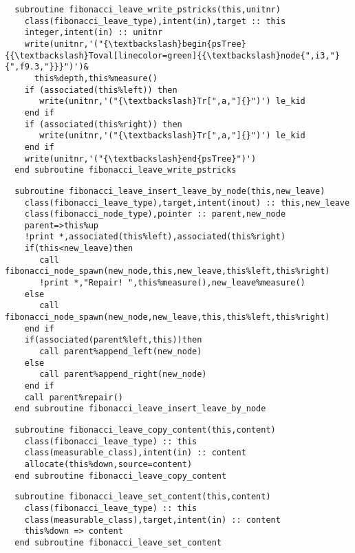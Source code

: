 \begin{Verbatim}
  subroutine fibonacci_leave_write_pstricks(this,unitnr)
    class(fibonacci_leave_type),intent(in),target :: this
    integer,intent(in) :: unitnr
    write(unitnr,'("{\textbackslash}begin{psTree}{{\textbackslash}Toval[linecolor=green]{{\textbackslash}node{",i3,"}{",f9.3,"}}}")')&
      this%depth,this%measure()
    if (associated(this%left)) then
       write(unitnr,'("{\textbackslash}Tr[",a,"]{}")') le_kid
    end if
    if (associated(this%right)) then
       write(unitnr,'("{\textbackslash}Tr[",a,"]{}")') le_kid
    end if
    write(unitnr,'("{\textbackslash}end{psTree}")')
  end subroutine fibonacci_leave_write_pstricks
\end{Verbatim}

\begin{Verbatim}
  subroutine fibonacci_leave_insert_leave_by_node(this,new_leave)
    class(fibonacci_leave_type),target,intent(inout) :: this,new_leave
    class(fibonacci_node_type),pointer :: parent,new_node
    parent=>this%up
    !print *,associated(this%left),associated(this%right)
    if(this<new_leave)then
       call fibonacci_node_spawn(new_node,this,new_leave,this%left,this%right)
       !print *,"Repair! ",this%measure(),new_leave%measure()
    else
       call fibonacci_node_spawn(new_node,new_leave,this,this%left,this%right)
    end if
    if(associated(parent%left,this))then
       call parent%append_left(new_node)
    else
       call parent%append_right(new_node)
    end if
    call parent%repair()
  end subroutine fibonacci_leave_insert_leave_by_node
\end{Verbatim}

\begin{Verbatim}
  subroutine fibonacci_leave_copy_content(this,content)
    class(fibonacci_leave_type) :: this
    class(measurable_class),intent(in) :: content
    allocate(this%down,source=content)
  end subroutine fibonacci_leave_copy_content
\end{Verbatim}

\begin{Verbatim}
  subroutine fibonacci_leave_set_content(this,content)
    class(fibonacci_leave_type) :: this
    class(measurable_class),target,intent(in) :: content
    this%down => content
  end subroutine fibonacci_leave_set_content
\end{Verbatim}

